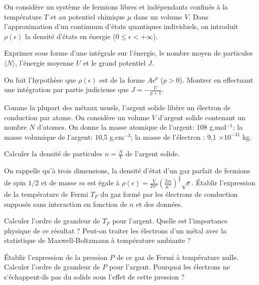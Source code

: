 On considère un système de fermions libres et indépendants confinés à la température $T$ et au potentiel chimique $\mu$ dans un volume $V$. Dans l'approximation d'un continuum d'états quantiques individuels, on introduit $\rho(\epsilon)$ la densité d'états en énergie ($0\le \epsilon < +\infty$).

\question Exprimer sous forme d'une intégrale sur l'énergie, le nombre moyen de particules $\langle N \rangle$, l'énergie moyenne $U$ et le grand potentiel $J$.

\question On fait l'hypothèse que $\rho(\epsilon)$ est de la forme $A\epsilon^p$ ($p >0$). Montrer en effectuant une intégration par partie judicieuse que $J=-\frac{U}{p+1}$.

Comme la plupart des métaux usuels, l’argent solide libère un électron de conduction par atome. On considère un volume $V$ d’argent solide contenant un nombre $N$ d’atomes. On donne la masse atomique de l'argent: 108 g.mol$^{-1}$; la masse volumique de l'argent: 10,5 g.cm$^{-3}$; la masse de l'électron : 9,1 $\times 10^{-31}$ kg.

\question Calculer la densité de particules $n=\frac{N}{V}$ de l'argent solide.


\question On rappelle qu'à trois dimensions, la densité d'état d'un gaz parfait de fermions de spin $1/2$ et de masse $m$ est égale à $\rho(\epsilon)=\frac{V}{2\pi^2}(\frac{2 m}{\hbar^2})^{\frac{3}{2}} \sqrt{\epsilon}$. \'Etablir l’expression de la température de Fermi $T_F$ du gaz formé par les électrons de conduction supposés sans interaction en fonction de $n$ et des données. 

\question Calculer l’ordre de grandeur de $T_F$ pour l’argent. Quelle est l’importance physique de ce résultat ?  Peut-on traiter les électrons d'un métal avec la statistique de Maxwell-Boltzmann à température ambiante ?

\question \'Etablir  l’expression de la pression $P$ de ce gaz de Fermi à température nulle. Calculer l’ordre de grandeur de $P$ pour l’argent. Pourquoi les électrons ne s’échappent-ils pas du solide sous l’effet de cette pression ?
